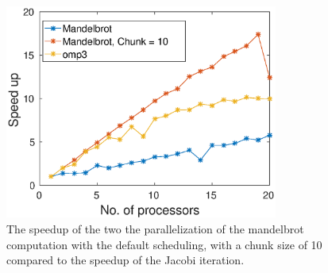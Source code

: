 \begin{figure}
\centering
\includegraphics[width = 0.8\textwidth]{fig/mandelbrot.eps}
\caption{The speedup of the two the parallelization of the mandelbrot computation with the default scheduling, with a chunk size of 10 compared to the speedup of the Jacobi iteration.}
\label{fig:mandelbrot}
\end{figure}
